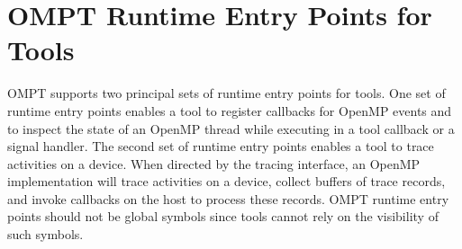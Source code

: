 %
%
%
%
%
%
%
%
%
%
%
%
%


\section{OMPT Runtime Entry Points for Tools}
\label{sec:entry-points}

OMPT supports two principal sets of runtime entry points for tools. One set of 
runtime entry points enables a tool to register callbacks for OpenMP events and 
to inspect the state of an OpenMP thread while executing in a tool callback or 
a signal handler. The second set of runtime entry points enables a tool to trace 
activities on a device. When directed by the tracing interface, an OpenMP 
implementation will trace activities on a device, collect buffers of trace 
records, and invoke callbacks on the host to process these records. OMPT runtime 
entry points should not be global symbols since tools cannot rely on the 
visibility of such symbols.

